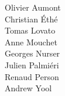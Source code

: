 Olivier Aumont         \\
Christian \'{E}th\'{e} \\
Tomas Lovato           \\
Anne Mouchet           \\
Georges Nurser         \\
Julien Palmi\'{e}ri    \\
Renaud Person    \\
Andrew Yool
